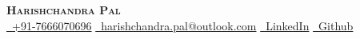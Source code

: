 \begin{center}
    \textbf{\LARGE \scshape Harishchandra Pal} \\ \vspace{1mm}
    \href{tel:+917666070696}{ \ +91-7666070696} \quad 
    \href{mailto:harishchandra.pal@outlook.com}{ \ harishchandra.pal@outlook.com} \quad
    \href{https://www.linkedin.com/in/hpal007/}{ \ LinkedIn} \quad
    \href{https://github.com/hpal007}{ \ Github}
\end{center}
